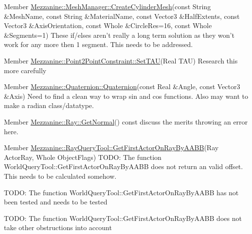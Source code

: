 \label{todo__todo000016}
\hypertarget{todo__todo000016}{}
 
\begin{DoxyDescription}
\item[Member \hyperlink{classMezzanine_1_1MeshManager_a6de2e01b43302a9439dc01c1dcc90f4c}{Mezzanine::MeshManager::CreateCylinderMesh}(const String \&MeshName, const String \&MaterialName, const Vector3 \&HalfExtents, const Vector3 \&AxisOrientation, const Whole \&CircleRes=16, const Whole \&Segments=1) ]These if/elses aren't really a long term solution as they won't work for any more then 1 segment. This needs to be addressed. 
\end{DoxyDescription}

\label{todo__todo000007}
\hypertarget{todo__todo000007}{}
 
\begin{DoxyDescription}
\item[Member \hyperlink{classMezzanine_1_1Point2PointConstraint_a9eba349fe0f12483330b9c309e305168}{Mezzanine::Point2PointConstraint::SetTAU}(Real TAU) ]Research this more carefully 
\end{DoxyDescription}

\label{todo__todo000018}
\hypertarget{todo__todo000018}{}
 
\begin{DoxyDescription}
\item[Member \hyperlink{classMezzanine_1_1Quaternion_a86a46d0ce78a6ce83cc40ed2d03349d4}{Mezzanine::Quaternion::Quaternion}(const Real \&Angle, const Vector3 \&Axis) ]Need to find a clean way to wrap sin and cos functions. Also may want to make a radian class/datatype. 
\end{DoxyDescription}

\label{todo__todo000019}
\hypertarget{todo__todo000019}{}
 
\begin{DoxyDescription}
\item[Member \hyperlink{classMezzanine_1_1Ray_a7164d929caf75bcebceed9149e9a3540}{Mezzanine::Ray::GetNormal}() const  ]discuss the merits throwing an error here. 
\end{DoxyDescription}

\label{todo__todo000020}
\hypertarget{todo__todo000020}{}
 
\begin{DoxyDescription}
\item[Member \hyperlink{classMezzanine_1_1RayQueryTool_a9ded1647755a523d3dbda297a0e73eba}{Mezzanine::RayQueryTool::GetFirstActorOnRayByAABB}(Ray ActorRay, Whole ObjectFlags) ]TODO: The function WorldQueryTool::GetFirstActorOnRayByAABB does not return an valid offset. This needs to be calculated somehow. 

TODO: The function WorldQueryTool::GetFirstActorOnRayByAABB has not been tested and needs to be tested 

TODO: The function WorldQueryTool::GetFirstActorOnRayByAABB does not take other obstructions into account 
\end{DoxyDescription}

